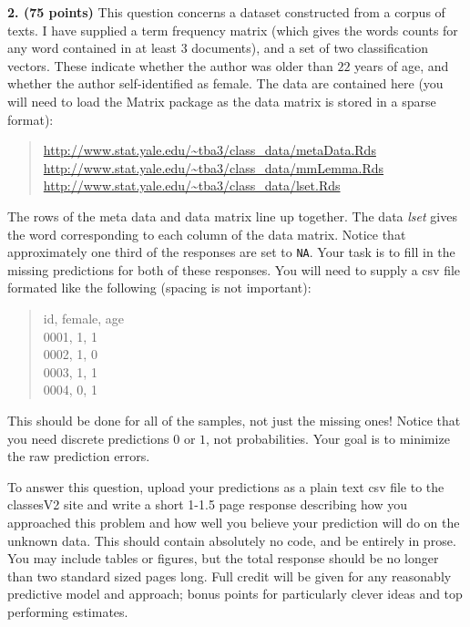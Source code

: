 \documentclass[12pt]{article}
\begin{document}
{\bf 2. (75 points)} This question concerns a dataset constructed from a corpus of texts.
I have supplied a term frequency matrix (which gives the words counts for any word contained
in at least $3$ documents), and a set of two classification vectors. These indicate whether
the author was older than $22$ years of age, and whether the author self-identified as
female. The data are contained here (you will need to load the Matrix package as the
data matrix is stored in a sparse format):
\begin{quote}
\url{http://www.stat.yale.edu/~tba3/class_data/metaData.Rds}\\
\url{http://www.stat.yale.edu/~tba3/class_data/mmLemma.Rds}\\
\url{http://www.stat.yale.edu/~tba3/class_data/lset.Rds}
\end{quote}
The rows of the meta data and data matrix line up together. The data \textit{lset} gives the word
corresponding to each column of the data matrix. Notice that approximately one third of the
responses are set to \texttt{NA}. Your task is
to fill in the missing predictions for both of these responses. You will need to supply
a csv file formated like the following (spacing is not important):
\begin{quote}
id,      female, age\\
0001,      1, 1\\
0002,      1, 0\\
0003,      1, 1\\
0004,      0, 1
\end{quote}
This should be done for all of the samples, not just the missing ones! Notice that you need
discrete predictions $0$ or $1$, not probabilities. Your goal is to minimize the raw
prediction errors.

To answer this question, upload your predictions as a plain text csv file to the classesV2
site and write a short 1-1.5 page response describing how you approached this problem and how
well you believe your prediction will do on the unknown data. This should contain absolutely
no code, and be entirely in prose. You may include tables or figures, but the total response
should be no longer than two standard sized pages long.
Full credit will be given for any reasonably predictive model and approach; bonus points for
particularly clever ideas and top performing estimates.
\end{document}
